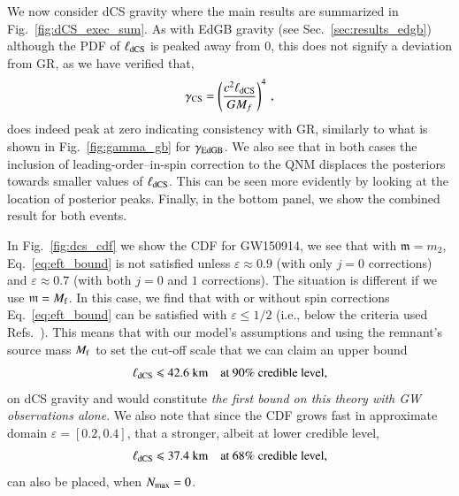 \documentclass[twocolumn,
               prd,
               aps,
               superscriptaddress,
               tightenlines,
               nofootinbib,
               eqsecnum,
               amsfonts,
               amsmath,
               longbibliography]{revtex4-1}
\newcommand{\gm}{\mathfrak{m}}
\newcommand{\agcomm}[1]{{\textcolor{red}{{[AG: #1]}}}}
\begin{document}
We now consider dCS gravity where the main results are summarized in Fig.~\ref{fig:dCS_exec_sum}.
%
As with EdGB gravity (see Sec.~\ref{sec:results_edgb}) although the PDF of $\ell_{\rm dCS}$
is peaked away from 0, this does not signify a deviation from GR, as we have verified that,
%
\begin{equation}
    \gamma_{\rm CS} = \left( \frac{c^2 \ell_{\rm dCS}}{G M_{f}} \right)^{4}\,,
\end{equation}
%
does indeed peak at zero indicating consistency with GR, similarly to what is
shown in Fig.~\ref{fig:gamma_gb} for $\gamma_{\rm EdGB}$.
%
We also see that in both cases the inclusion of leading-order--in-spin
correction to the QNM displaces the posteriors towards smaller values of
$\ell_{\rm dCS}$. This can be seen more evidently by looking at the location of
posterior peaks.
%
Finally, in the bottom panel, we show the combined result for both events.

In Fig.~\ref{fig:dcs_cdf} we show the CDF for GW150914, we see that with $\gm = m_2$,
Eq.~\eqref{eq:eft_bound} is not satisfied unless $\varepsilon \approx 0.9$ (with only $j=0$ corrections) and
$\varepsilon \approx 0.7$ (with both $j=0$ and $1$ corrections).
%
The situation is different if we use $\gm = M_{\rm f}$. In this case, we find that
with or without spin corrections Eq.~\eqref{eq:eft_bound} can be satisfied
with $\varepsilon \leqslant 1/2$ (i.e., below the criteria used
Refs.~\cite{Nair:2019iur,Perkins:2021mhb,Lyu:2022gdr}).
%
This means that with our model's assumptions and using the remnant's source mass $M_{\rm f}$ to set the
cut-off scale that we can claim an upper bound
%
\begin{equation}
\ell_{\rm dCS} \leqslant 42.6~\textrm{km}
\quad \textrm{at 90\% credible level},
\end{equation}
%
on dCS gravity and would constitute \emph{the first bound on this theory with GW
observations alone}.
%
We also note that since the CDF grows fast in approximate domain $\varepsilon = [0.2, 0.4]$,
that a stronger, albeit at lower credible level,
%
\begin{equation}
\ell_{\rm dCS} \leqslant 37.4~\textrm{km}
\quad \textrm{at 68\% credible level},
\end{equation}
%
can also be placed, when $N_{\rm max}=0$.
\end{document}
